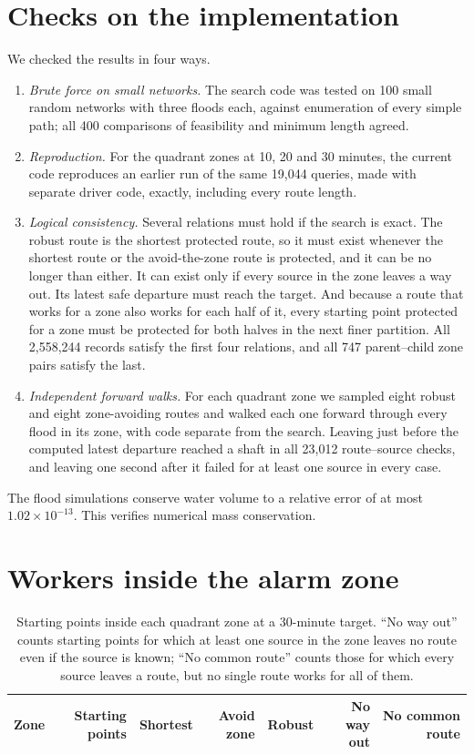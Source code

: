 \documentclass[11pt,a4paper]{article}
\begin{document}
\section{Checks on the implementation}\label{app:checks}
We checked the results in four ways.
\begin{enumerate}
\item \emph{Brute force on small networks.} The search code was tested on 100 small random networks with three floods each, against enumeration of every simple path; all 400 comparisons of feasibility and minimum length agreed.
\item \emph{Reproduction.} For the quadrant zones at 10, 20 and 30 minutes, the current code reproduces an earlier run of the same 19,044 queries, made with separate driver code, exactly, including every route length.
\item \emph{Logical consistency.} Several relations must hold if the search is exact. The robust route is the shortest protected route, so it must exist whenever the shortest route or the avoid-the-zone route is protected, and it can be no longer than either. It can exist only if every source in the zone leaves a way out. Its latest safe departure must reach the target. And because a route that works for a zone also works for each half of it, every starting point protected for a zone must be protected for both halves in the next finer partition. All 2,558,244 records satisfy the first four relations, and all 747 parent--child zone pairs satisfy the last.
\item \emph{Independent forward walks.} For each quadrant zone we sampled eight robust and eight zone-avoiding routes and walked each one forward through every flood in its zone, with code separate from the search. Leaving just before the computed latest departure reached a shaft in all 23,012 route--source checks, and leaving one second after it failed for at least one source in every case.
\end{enumerate}
The flood simulations conserve water volume to a relative error of at most $1.02\times10^{-13}$. This verifies numerical mass conservation.

\section{Workers inside the alarm zone}\label{app:inside}
\begin{table}[htbp]
\centering\small
\caption{Starting points inside each quadrant zone at a 30-minute target. ``No way out'' counts starting points for which at least one source in the zone leaves no route even if the source is known; ``No common route'' counts those for which every source leaves a route, but no single route works for all of them.}
\begin{tabular}{@{}lrrrrrr@{}}\toprule
Zone & Starting points & Shortest & Avoid zone & Robust & No way out & No common route\\\midrule

\end{tabular}
\end{table}
\end{document}
